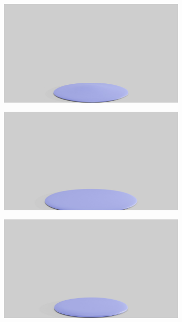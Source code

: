 \begin{figure}
\begin{subfigure}{.16\linewidth}
		{\includegraphics[width=2.0\textwidth]{images/soft_ball/0495/0250.jpg}}
		\label{sfig:ball-0495-2}
	\end{subfigure}%
	\begin{subfigure}{.16\linewidth}
		\centering
		{\includegraphics[width=2.0\textwidth]{images/soft_ball/0495/0300.jpg}}
		\label{sfig:ball-0495-3}
	\end{subfigure}%
	\begin{subfigure}{.16\linewidth}
		\centering
		{\includegraphics[width=2.0\textwidth]{images/soft_ball/0495/0350.jpg}}

\end{subfigure}
\end{figure}
